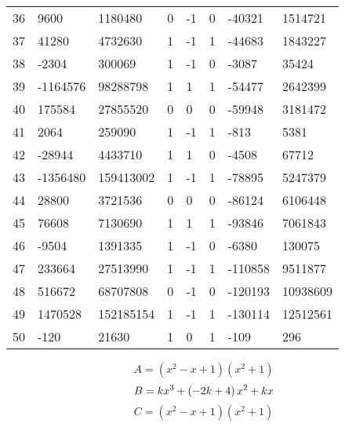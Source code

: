 \documentclass{amsart}
\begin{document}
\begin{longtable}{|l|l|l|lllll|}
36&9600&1180480&0&-1&0&-40321&1514721\\
37&41280&4732630&1&-1&1&-44683&1843227\\
38&-2304&300069&1&-1&0&-3087&35424\\
39&-1164576&98288798&1&1&1&-54477&2642399\\
40&175584&27855520&0&0&0&-59948&3181472\\
41&2064&259090&1&-1&1&-813&5381\\
42&-28944&4433710&1&1&0&-4508&67712\\
43&-1356480&159413002&1&-1&1&-78895&5247379\\
44&28800&3721536&0&0&0&-86124&6106448\\
45&76608&7130690&1&1&1&-93846&7061843\\
46&-9504&1391335&1&-1&0&-6380&130075\\
47&233664&27513990&1&-1&1&-110858&9511877\\
48&516672&68707808&0&-1&0&-120193&10938609\\
49&1470528&152185154&1&-1&1&-130114&12512561\\
50&-120&21630&1&0&1&-109&296\\
\hline
\end{longtable}
$$A=(x^2
 - x
 + 1)(x^2
 + 1)$$
$$B=k\*x^3
 + \left(-2\*k
 + 4\right) \*x^2
 + k\*x$$
$$C=(x^2
 - x
 + 1)(x^2
 + 1)$$
\end{document}
